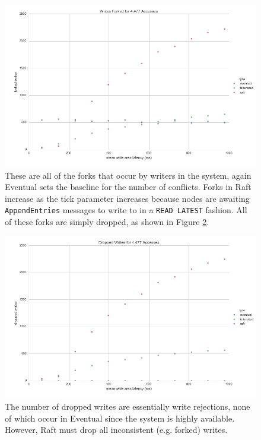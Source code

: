 \documentclass[11pt,letterpaper]{article}
\begin{document}
\begin{figure}[!h]
    \centering
        \includegraphics[width=\textwidth]{figures/forked_writes.png}
        \caption{\textsf{These are all of the forks that occur by writers in the system, again Eventual sets the baseline for the number of conflicts. Forks in Raft increase as the tick parameter increases because nodes are awaiting \texttt{AppendEntries} messages to write to in a \texttt{READ LATEST} fashion. All of these forks are simply dropped, as shown in Figure \ref{fig:dropped_writes}.}}
        \label{fig:forked_writes}
\end{figure}


\begin{figure}[!h]
    \centering
        \includegraphics[width=\textwidth]{figures/dropped_writes.png}
        \caption{\textsf{The number of dropped writes are essentially write rejections, none of which occur in Eventual since the system is highly available. However, Raft must drop all inconsistent (e.g. forked) writes.}}
        \label{fig:dropped_writes}
\end{figure}
\end{document}
